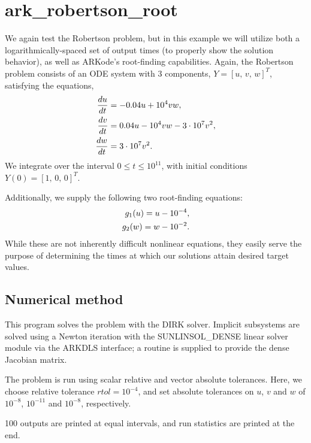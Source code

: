 \documentclass[letterpaper,10pt,english]{sphinxmanual}
\begin{document}
\section{ark\_robertson\_root}
\label{c_serial:ark-robertson-root}\label{c_serial:id15}
We again test the Robertson problem, but in this example we will
utilize both a logarithmically-spaced set of output times (to properly
show the solution behavior), as well as ARKode's root-finding
capabilities.  Again, the Robertson problem consists of an ODE system
with 3 components, \(Y = [u,\, v,\, w]^T\), satisfying the equations,
\begin{gather}
\begin{split}\frac{du}{dt} &= -0.04 u + 10^4 v w, \\
\frac{dv}{dt} &= 0.04 u - 10^4 v w - 3\cdot10^7 v^2, \\
\frac{dw}{dt} &= 3\cdot10^7 v^2.\end{split}\notag
\end{gather}
We integrate over the interval \(0\le t\le 10^{11}\), with initial
conditions  \(Y(0) = [1,\, 0,\, 0]^T\).

Additionally, we supply the following two root-finding equations:
\begin{gather}
\begin{split}g_1(u) = u - 10^{-4}, \\
g_2(w) = w - 10^{-2}.\end{split}\notag
\end{gather}
While these are not inherently difficult nonlinear equations, they
easily serve the purpose of determining the times at which our
solutions attain desired target values.


\subsection{Numerical method}
\label{c_serial:id16}
This program solves the problem with the DIRK solver.  Implicit
subsystems are solved using a Newton iteration with the
SUNLINSOL\_DENSE linear solver module via the ARKDLS interface; a
routine is supplied to provide the dense Jacobian matrix.

The problem is run using scalar relative and vector absolute
tolerances.  Here, we choose relative tolerance \(rtol=10^{-4}\),
and set absolute tolerances on \(u\), \(v\) and \(w\) of
\(10^{-8}\), \(10^{-11}\) and \(10^{-8}\), respectively.

100 outputs are printed at equal intervals, and run statistics are
printed at the end.
\end{document}
